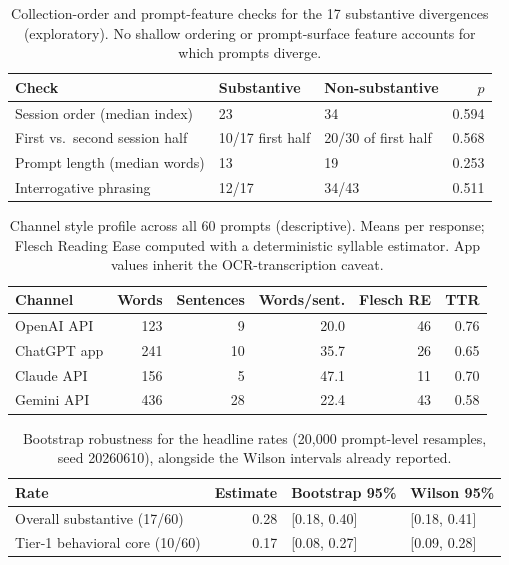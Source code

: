 \begin{table}[htbp]
\centering
\caption{Collection-order and prompt-feature checks for the 17 substantive divergences (exploratory). No shallow ordering or prompt-surface feature accounts for which prompts diverge.}
\label{tab:order-feature-checks}
\small
\begin{tabular}{lllr}
\toprule
Check & Substantive & Non-substantive & $p$ \\
\midrule
Session order (median index) & 23 & 34 & 0.594 \\
First vs.\ second session half & 10/17 first half & 20/30 of first half & 0.568 \\
Prompt length (median words) & 13 & 19 & 0.253 \\
Interrogative phrasing & 12/17 & 34/43 & 0.511 \\
\bottomrule
\end{tabular}
\end{table}

\begin{table}[htbp]
\centering
\caption{Channel style profile across all 60 prompts (descriptive). Means per response; Flesch Reading Ease computed with a deterministic syllable estimator. App values inherit the OCR-transcription caveat.}
\label{tab:channel-style-profile}
\small
\begin{tabular}{lrrrrr}
\toprule
Channel & Words & Sentences & Words/sent. & Flesch RE & TTR \\
\midrule
OpenAI API & 123 & 9 & 20.0 & 46 & 0.76 \\
ChatGPT app & 241 & 10 & 35.7 & 26 & 0.65 \\
Claude API & 156 & 5 & 47.1 & 11 & 0.70 \\
Gemini API & 436 & 28 & 22.4 & 43 & 0.58 \\
\bottomrule
\end{tabular}
\end{table}

\begin{table}[htbp]
\centering
\caption{Bootstrap robustness for the headline rates (20{,}000 prompt-level resamples, seed 20260610), alongside the Wilson intervals already reported.}
\label{tab:bootstrap-rates}
\small
\begin{tabular}{lrll}
\toprule
Rate & Estimate & Bootstrap 95\% & Wilson 95\% \\
\midrule
Overall substantive (17/60) & 0.28 & [0.18, 0.40] & [0.18, 0.41] \\
Tier-1 behavioral core (10/60) & 0.17 & [0.08, 0.27] & [0.09, 0.28] \\
\bottomrule
\end{tabular}
\end{table}
